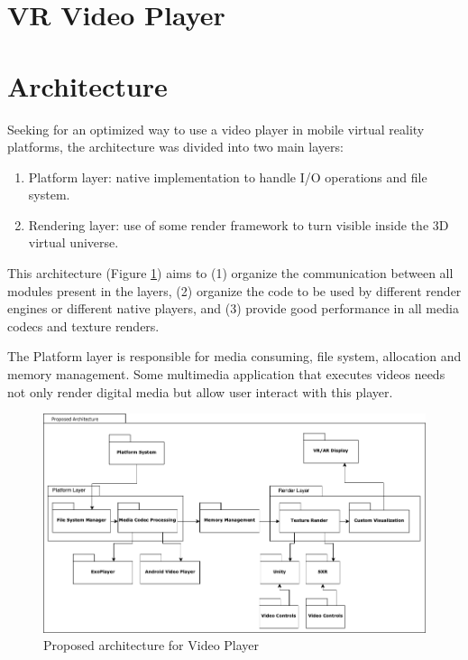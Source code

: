 \documentclass[runningheads]{llncs}
\begin{document}
\section{VR Video Player}

\section{Architecture} \label{architecture}


Seeking for an optimized way to use a video player in mobile virtual reality platforms, the architecture was divided into two main layers:

\begin{enumerate}
    \item Platform layer: native implementation to handle I/O operations and file system.
    \item Rendering layer: use of some render framework to turn visible inside the 3D virtual universe.
\end{enumerate}

This architecture (Figure \ref{fig-video-player-arch}) aims to (1) organize the communication between all modules present in the layers, (2) organize the code to be used by different render engines or different native players, and (3) provide good performance in all media codecs and texture renders.

The Platform layer is responsible for media consuming, file system, allocation and memory management. Some multimedia application that executes videos needs not only render digital media but allow user interact with this player.

\begin{figure}[h!]
    \centerline{\includegraphics[scale=0.5]{images/ProposedArch.png}}
    \caption{Proposed architecture for Video Player}
    \label{fig-video-player-arch}
\end{figure}
\end{document}
